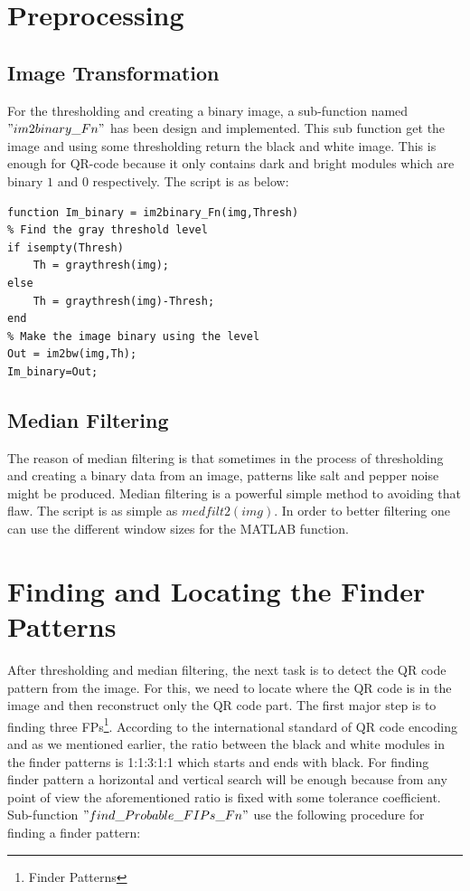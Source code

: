 \section{Preprocessing}

\subsection{Image Transformation}

For the thresholding and creating a binary image, a sub-function named \textbf{$"im2binary\_Fn"$} has been design and implemented. This sub function get the image and using some thresholding return the black and white image. This is enough for QR-code because it only contains dark and bright modules which are binary $1$ and $0$ respectively. The script is as below:
\begin{lstlisting}
function Im_binary = im2binary_Fn(img,Thresh)
% Find the gray threshold level
if isempty(Thresh)
    Th = graythresh(img);
else
    Th = graythresh(img)-Thresh;
end
% Make the image binary using the level
Out = im2bw(img,Th);
Im_binary=Out;
\end{lstlisting}

\subsection{Median Filtering}

The reason of median filtering is that sometimes in the process of thresholding and creating a binary data from an image, patterns like salt and pepper noise might be produced. Median filtering is a powerful simple method to avoiding that flaw. The script is as simple as $ medfilt2(img)$. In order to better filtering one can use the different window sizes for the MATLAB function.

\section{Finding and Locating the Finder Patterns}

After thresholding and median filtering, the next task is to detect the QR code pattern from the image. For
this, we need to locate where the QR code is in the image and then reconstruct only the QR code part. The first major step is to finding three FPs\footnote{Finder Patterns}. According to the international
standard of QR code encoding \cite{1iso} and as we mentioned earlier, the ratio between the black and white modules in the
finder patterns is 1:1:3:1:1 which starts and ends with black. For finding finder pattern a horizontal and vertical search will be enough because from any point of view the aforementioned ratio is fixed with some tolerance coefficient. Sub-function $"find\_Probable\_FIPs\_Fn"$ use the following procedure for finding a finder pattern:

